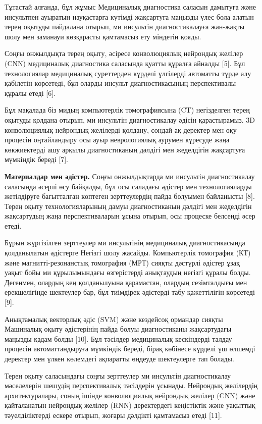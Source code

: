 Тұтастай алғанда, бұл жұмыс Медициналық диагностика саласын дамытуға
және инсультпен ауыратын науқастарға күтімді жақсартуға маңызды үлес
бола алатын терең оқытуды пайдалана отырып, ми инсультін
диагностикалауға жан-жақты шолу мен заманауи көзқарасты қамтамасыз ету
міндетін қояды.

Соңғы онжылдықта терең оқыту, әсіресе конволюциялық нейрондық желілер
(CNN) медициналық диагностика саласында қуатты құралға айналды {[}5{]}.
Бұл технологиялар медициналық суреттерден күрделі үлгілерді автоматты
түрде алу қабілетін көрсетеді, бұл оларды инсульт диагностикасының
перспективалы құралы етеді {[}6{]}.

Бұл мақалада біз мидың компьютерлік томографиясына (CT) негізделген
терең оқытуды қолдана отырып, ми инсультін диагностикалау әдісін
қарастырамыз. 3D конволюциялық нейрондық желілерді қолдану, сондай-ақ
деректер мен оқу процесін оңтайландыру осы ауыр неврологиялық аурумен
күресуде жаңа көкжиектерді ашу арқылы диагностиканың дәлдігі мен
жеделдігін жақсартуға мүмкіндік береді {[}7{]}.

\textbf{Материалдар мен әдістер.} Соңғы онжылдықтарда ми инсультін
диагностикалау саласында әсерлі өсу байқалды, бұл осы саладағы әдістер
мен технологияларды жетілдіруге бағытталған көптеген зерттеулердің пайда
болуымен байланысты {[}8{]}. Терең оқыту технологияларының дамуы
диагностиканың дәлдігі мен жеделдігін жақсартудың жаңа перспективаларын
ұсына отырып, осы процеске белсенді әсер етеді.

Бұрын жүргізілген зерттеулер ми инсультінің медициналық диагностикасында
қолданылатын әдістерге Негізгі шолу жасайды. Компьютерлік томография
(КТ) және магнитті-резонанстық томография (МРТ) сияқты дәстүрлі әдістер
ұзақ уақыт бойы ми құрылымындағы өзгерістерді анықтаудың негізгі құралы
болды. Дегенмен, олардың кең қолданылуына қарамастан, олардың
сезімталдығы мен ерекшелігінде шектеулер бар, бұл тиімдірек әдістерді
табу қажеттілігін көрсетеді {[}9{]}.

Анықтамалық векторлық әдіс (SVM) және кездейсоқ ормандар сияқты
Машиналық оқыту әдістерінің пайда болуы диагностиканы жақсартудағы
маңызды қадам болды {[}10{]}. Бұл тәсілдер медициналық кескіндерді
талдау процесін автоматтандыруға мүмкіндік береді, бірақ көбінесе
күрделі үш өлшемді деректер мен үлкен көлемдегі ақпаратты өңдеуде
шектеулерге тап болады.

Терең оқыту саласындағы соңғы зерттеулер ми инсультін диагностикалау
мәселелерін шешудің перспективалық тәсілдерін ұсынады. Нейрондық
желілердің архитектуралары, соның ішінде конволюциялық нейрондық желілер
(CNN) және қайталанатын нейрондық желілер (RNN) деректердегі кеңістіктік
және уақыттық тәуелділіктерді ескере отырып, жоғары дәлдікті қамтамасыз
етеді {[}11{]}.


